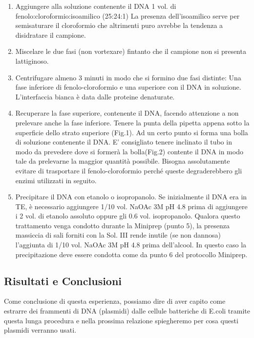 \begin{enumerate}
  \item Aggiungere alla soluzione contenente il DNA 1 vol. di fenolo:cloroformio:isoamilico (25:24:1)
	La presenza dell’isoamilico serve per semisaturare il cloroformio che altrimenti puro avrebbe la
	tendenza a disidratare il campione.

  \item Miscelare le due fasi (non vortexare) fintanto che il campione non si presenta lattiginoso.

  \item Centrifugare almeno 3 minuti in modo che si formino due fasi distinte:
	Una fase inferiore di fenolo-cloroformio e una superiore con il DNA in soluzione.
	L’interfaccia bianca è data dalle proteine denaturate.

  \item Recuperare la fase superiore, contenente il DNA, facendo attenzione a non
	prelevare anche la fase inferiore. Tenere la punta della pipetta appena sotto la superficie
	dello strato superiore (Fig.1). Ad un certo punto si forma una bolla di soluzione contenente il DNA.
	E’ consigliato tenere inclinato il tubo in modo da prevedere dove si formerà la bolla(Fig.2) contente il DNA in modo
	tale da prelevarne la maggior quantità possibile. Bisogna assolutamente evitare di trasportare il fenolo-cloroformio
	perché queste degraderebbero gli enzimi utilizzati in seguito.

  \item Precipitare il DNA con etanolo o isopropanolo. Se inizialmente il DNA era in TE, è necessario aggiungere 1/10 vol.
	NaOAc 3M pH 4.8 prima di aggiungere i 2 vol. di etanolo assoluto oppure gli 0.6 vol. isopropanolo.
	Qualora questo trattamento venga condotto durante la Miniprep (punto 5), la presenza massiccia di sali forniti con
	la Sol. III  rende inutile (se non dannosa) l’aggiunta di 1/10 vol. NaOAc 3M pH 4.8 prima dell’alcool.
	In questo caso la precipitazione deve essere condotta come da punto 6 del protocollo Miniprep.


\end{enumerate}

\subsection{Risultati e Conclusioni}

Come conclusione di questa esperienza, possiamo dire di aver capito come estrarre dei frammenti di DNA (plasmidi)
dalle cellule batteriche di E.coli tramite questa lunga procedura e nella prossima relazione spiegheremo per cosa
questi plasmidi verranno usati.
